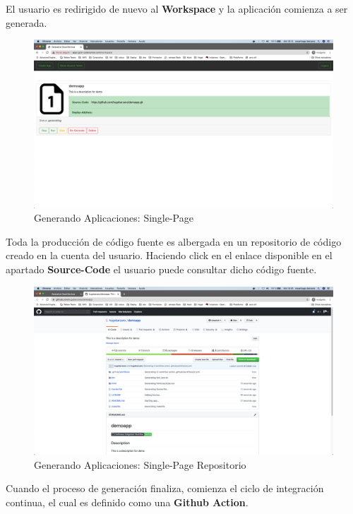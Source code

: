 \documentclass[a4paper,11pt]{book}
\begin{document}
El usuario es redirigido de nuevo al \textbf{Workspace} y la aplicación comienza a ser generada. 

\begin{figure}[H]
\centering
\includegraphics[scale=0.2]{imagenes/casouso/9.png}
\caption{ Generando Aplicaciones: Single-Page  }
\end{figure}


Toda la producción de código fuente es albergada en un repositorio de código creado en la cuenta del usuario. Haciendo click en el enlace disponible en el apartado \textbf{Source-Code}
el usuario puede consultar dicho código fuente. 

\begin{figure}[H]
\centering
\includegraphics[scale=0.2]{imagenes/casouso/10.png}
\caption{  Generando Aplicaciones: Single-Page Repositorio }
\end{figure}

Cuando el proceso de generación finaliza, comienza el ciclo de integración continua, el cual es definido como una \textbf{Github Action}.
\end{document}
